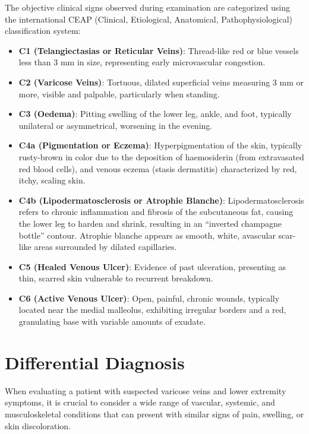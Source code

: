 The objective clinical signs observed during examination are categorized using the international CEAP (Clinical, Etiological, Anatomical, Pathophysiological) classification system:
\begin{itemize}
\item \textbf{C1 (Telangiectasias or Reticular Veins)}: Thread-like red or blue vessels less than 3 mm in size, representing early microvascular congestion.
\item \textbf{C2 (Varicose Veins)}: Tortuous, dilated superficial veins measuring 3 mm or more, visible and palpable, particularly when standing.
\item \textbf{C3 (Oedema)}: Pitting swelling of the lower leg, ankle, and foot, typically unilateral or asymmetrical, worsening in the evening.
\item \textbf{C4a (Pigmentation or Eczema)}: Hyperpigmentation of the skin, typically rusty-brown in color due to the deposition of haemosiderin (from extravasated red blood cells), and venous eczema (stasis dermatitis) characterized by red, itchy, scaling skin.
\item \textbf{C4b (Lipodermatosclerosis or Atrophie Blanche)}: Lipodermatosclerosis refers to chronic inflammation and fibrosis of the subcutaneous fat, causing the lower leg to harden and shrink, resulting in an ``inverted champagne bottle'' contour. Atrophie blanche appears as smooth, white, avascular scar-like areas surrounded by dilated capillaries.
\item \textbf{C5 (Healed Venous Ulcer)}: Evidence of past ulceration, presenting as thin, scarred skin vulnerable to recurrent breakdown.
\item \textbf{C6 (Active Venous Ulcer)}: Open, painful, chronic wounds, typically located near the medial malleolus, exhibiting irregular borders and a red, granulating base with variable amounts of exudate.
\end{itemize}

\section*{Differential Diagnosis}
When evaluating a patient with suspected varicose veins and lower extremity symptoms, it is crucial to consider a wide range of vascular, systemic, and musculoskeletal conditions that can present with similar signs of pain, swelling, or skin discoloration.

